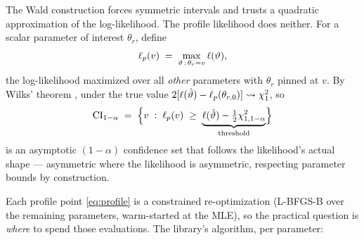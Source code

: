 The Wald construction forces symmetric intervals and trusts a quadratic
approximation of the log-likelihood. The profile likelihood does neither.
For a scalar parameter of interest $\theta_r$, define
\begin{equation}
  \ell_p(v)
  \;=\;
  \max_{\vartheta\,:\,\theta_r = v} \ell(\vartheta),
  \label{eq:profile}
\end{equation}
the log-likelihood maximized over all \emph{other} parameters with
$\theta_r$ pinned at $v$. By Wilks' theorem \citep{Wilks1938}, under the
true value $2[\ell(\hat{\vartheta}) - \ell_p(\theta_{r,0})]
\rightsquigarrow \chi^2_1$, so
\begin{equation}
  \mathrm{CI}_{1-\alpha}
  \;=\;
  \Bigl\{ v \;:\; \ell_p(v) \;\ge\;
  \underbrace{\ell(\hat{\vartheta}) - \tfrac12 \chi^2_{1,1-\alpha}}_{\text{threshold}}
  \Bigr\}
  \label{eq:profile-ci}
\end{equation}
is an asymptotic $(1-\alpha)$ confidence set that follows the likelihood's
actual shape --- asymmetric where the likelihood is asymmetric, respecting
parameter bounds by construction.

Each profile point \eqref{eq:profile} is a constrained re-optimization
(L-BFGS-B over the remaining parameters, warm-started at the MLE), so the
practical question is \emph{where} to spend those evaluations. The
library's algorithm, per parameter:

